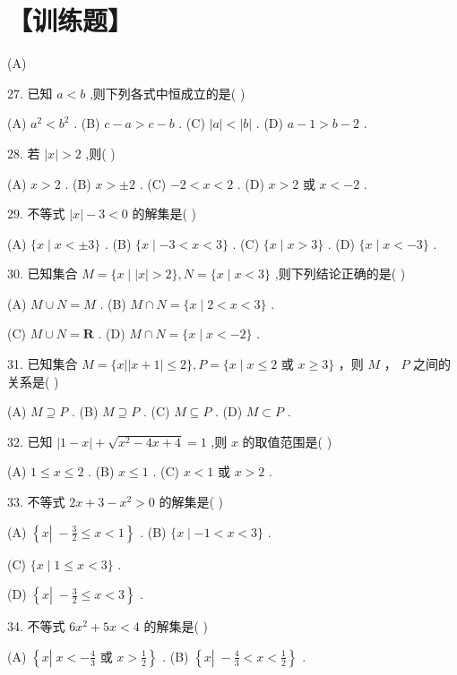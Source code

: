 \documentclass[10pt]{article}
\begin{document}
\section*{【训练题】}

(A)

27. 已知 \(a < b\) ,则下列各式中恒成立的是( )

(A) \({a}^{2} < {b}^{2}\) . (B) \(c - a > c - b\) . (C) \(\left| a\right|  < \left| b\right|\) . (D) \(a - 1 > b - 2\) .

28. 若 \(\left| x\right|  > 2\) ,则(   )

(A) \(x > 2\) . (B) \(x >  \pm  2\) . (C) \(- 2 < x < 2\) . (D) \(x > 2\) 或 \(x <  - 2\) .

29. 不等式 \(\left| x\right|  - 3 < 0\) 的解集是( )

(A) \(\{ x \mid  x <  \pm  3\}\) . (B) \(\{ x \mid   - 3 < x < 3\}\) . (C) \(\{ x \mid  x > 3\}\) . (D) \(\{ x \mid  x <  - 3\}\) .

30. 已知集合 \(M = \{ x \mid  \left| x\right|  > 2\} ,N = \{ x \mid  x < 3\}\) ,则下列结论正确的是( )

(A) \(M \cup  N = M\) . (B) \(M \cap  N = \{ x \mid  2 < x < 3\}\) .

(C) \(M \cup  N = \mathbf{R}\) . (D) \(M \cap  N = \{ x \mid  x <  - 2\}\) .

31. 已知集合 \(M = \{ x\left| \right| x + 1 \mid   \leq  2\} ,P = \{ x \mid  x \leq  2\) 或 \(x \geq  3\}\) ，则 \(M\) ， \(P\) 之间的关系是( )

(A) \(M \supseteq  P\) . (B) \(M \supseteq  P\) . (C) \(M \subseteq  P\) . (D) \(M \subset  P\) .

32. 已知 \(\left| {1 - x}\right|  + \sqrt{{x}^{2} - {4x} + 4} = 1\) ,则 \(x\) 的取值范围是( )

(A) \(1 \leq  x \leq  2\) . (B) \(x \leq  1\) . (C) \(x < 1\) 或 \(x > 2\) .

33. 不等式 \({2x} + 3 - {x}^{2} > 0\) 的解集是( )

(A) \(\left\{  {x\left| {\; - \frac{3}{2} \leq  x < 1}\right. }\right\}\) . (B) \(\{ x \mid   - 1 < x < 3\}\) .

(C) \(\{ x \mid  1 \leq  x < 3\}\) .

(D) \(\left\{  {x\left| {\; - \frac{3}{2} \leq  x < 3}\right. }\right\}\) .

34. 不等式 \(6{x}^{2} + {5x} < 4\) 的解集是( )

(A) \(\left\{  {x\left| {\;x <  - \frac{4}{3}}\right. }\right.\) 或 \(\left. {x > \frac{1}{2}}\right\}\) . (B) \(\left\{  {x\left| {\; - \frac{4}{3} < x < \frac{1}{2}}\right. }\right\}\) .
\end{document}
